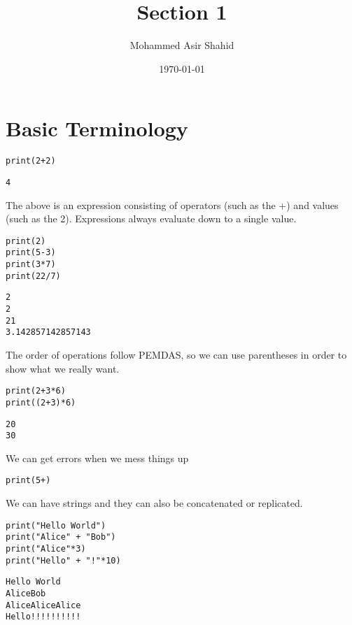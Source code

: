 \documentclass[11pt]{article}
\author{Mohammed Asir Shahid}
\date{\today}
\title{Section 1}
\begin{document}
\maketitle
\tableofcontents


\section{Basic Terminology}
\label{sec:org10396ca}


\begin{verbatim}
print(2+2)
\end{verbatim}

\begin{verbatim}
4
\end{verbatim}


The above is an expression consisting of operators (such as the +) and values (such as the 2). Expressions always evaluate down to a single value.

\begin{verbatim}
print(2)
print(5-3)
print(3*7)
print(22/7)
\end{verbatim}

\begin{verbatim}
2
2
21
3.142857142857143
\end{verbatim}


The order of operations follow PEMDAS, so we can use parentheses in order to show what we really want.


\begin{verbatim}
print(2+3*6)
print((2+3)*6)
\end{verbatim}

\begin{verbatim}
20
30
\end{verbatim}


We can get errors when we mess things up

\begin{verbatim}
print(5+)
\end{verbatim}

We can have strings and they can also be concatenated or replicated.

\begin{verbatim}
print("Hello World")
print("Alice" + "Bob")
print("Alice"*3)
print("Hello" + "!"*10)
\end{verbatim}

\begin{verbatim}
Hello World
AliceBob
AliceAliceAlice
Hello!!!!!!!!!!
\end{verbatim}
\end{document}
